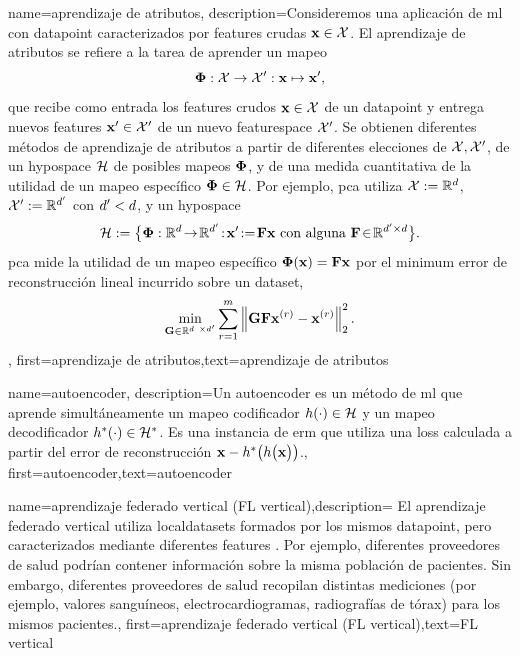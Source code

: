 {name={aprendizaje de atributos},
	description={Consideremos una aplicación de \gls{ml} con \gls{datapoint} caracterizados por 
	\gls{feature}s crudas ${\bf x} \in \mathcal{X}$. El aprendizaje de atributos
	se refiere a la tarea de aprender un mapeo
		$${\bf \Phi}: \mathcal{X} \rightarrow \mathcal{X}': {\bf x} \mapsto {\bf x}',$$ 
		que recibe como entrada los \gls{feature}s crudos ${\bf x} \in \mathcal{X}$ de un \gls{datapoint} y entrega nuevos
		\gls{feature}s ${\bf x}' \in \mathcal{X}'$ de un nuevo \gls{featurespace} $\mathcal{X}'$. 
		Se obtienen diferentes métodos de aprendizaje de atributos a partir de diferentes elecciones de 
		$\mathcal{X},\mathcal{X}'$, de un \gls{hypospace} $\mathcal{H}$ de posibles mapeos ${\bf \Phi}$, 
		y de una medida cuantitativa de la utilidad de un mapeo específico ${\bf \Phi} \in \mathcal{H}$. Por ejemplo, \gls{pca} utiliza $\mathcal{X} := \mathbb{R}^{d}$, $\mathcal{X}' := \mathbb{R}^{d'}$
		con $d' < d$, y un \gls{hypospace}
		$$\hypospace\defeq \big\{ \featuremapvec: \mathbb{R}^{\dimlocalmodel}
		\!\rightarrow\! \mathbb{R}^{\dimlocalmodel'}\!:\!\featurevec'\!\defeq\!\mF \featurevec \mbox{ con alguna } \mF \!\in\! \mathbb{R}^{\dimlocalmodel' \times \dimlocalmodel} \big\}.$$ \Gls{pca} mide la utilidad de un mapeo específico ${\bf \Phi}({\bf x})= \mathbf{F} {\bf x}$ 
		por el \gls{minimum} error de reconstrucción lineal incurrido sobre un \gls{dataset}, 
$$ \min_{\mG \in \mathbb{R}^{\dimlocalmodel \times \dimlocalmodel'}} \sum_{\sampleidx=1}^{\samplesize} \normgeneric{\mG \mF \featurevec^{(\sampleidx)} - \featurevec^{(\sampleidx)}}{2}^{2}.$$ }, 
	first={aprendizaje de atributos},text={aprendizaje de atributos}
} 

{name={autoencoder},
	description={Un autoencoder es un método de \gls{ml} que aprende simultáneamente un mapeo codificador
		$h(\cdot) \in \mathcal{H}$ y un mapeo decodificador $h^{*}(\cdot) \in \mathcal{H}^{*}$. 
		Es una instancia de \gls{erm} que utiliza una \gls{loss} calculada a partir del error de reconstrucción 
		${\bf x} - h^{*}\big(  h \big( {\bf x} \big) \big)$.},
	first={autoencoder},text={autoencoder}
} 

{name={aprendizaje federado vertical (FL vertical)},description=
	{El aprendizaje federado vertical utiliza \gls{localdataset}s
	 formados por los mismos \gls{datapoint}, pero caracterizados mediante diferentes \gls{feature}s \cite{VFLChapter}. 
    Por ejemplo, diferentes proveedores de salud podrían contener información
	 sobre la misma población de pacientes. Sin embargo, diferentes proveedores de salud
	 recopilan distintas mediciones (por ejemplo, valores sanguíneos, electrocardiogramas, radiografías de tórax)
	 para los mismos pacientes.},
	first={aprendizaje federado vertical (FL vertical)},text={FL vertical}
} 

